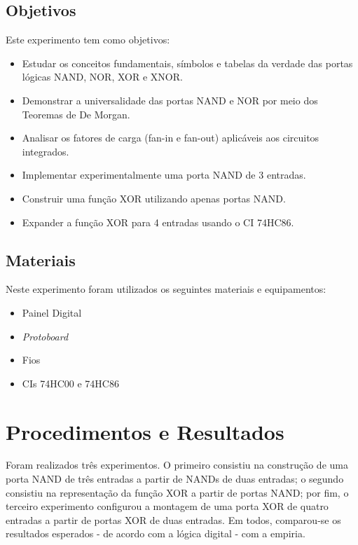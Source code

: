 \documentclass[12pt]{article}
\begin{document}
\subsection{Objetivos}
\label{sec:Objetivos}

Este experimento tem como objetivos:
\begin{itemize}
    \item Estudar os conceitos fundamentais, símbolos e tabelas da verdade das portas lógicas NAND, NOR, XOR e XNOR.
    \item Demonstrar a universalidade das portas NAND e NOR por meio dos Teoremas de De Morgan.
    \item Analisar os fatores de carga (fan-in e fan-out) aplicáveis aos circuitos integrados.
    \item Implementar experimentalmente uma porta NAND de 3 entradas.
    \item Construir uma função XOR utilizando apenas portas NAND.
    \item Expander a função XOR para 4 entradas usando o CI 74HC86.
\end{itemize}

\subsection{Materiais} 
\label{sec:Materiais}
Neste experimento foram utilizados os seguintes materiais e equipamentos:
\begin{itemize}
    \item Painel Digital

    \item \textit{Protoboard}
    
    \item Fios
    
    \item CIs 74HC00 e 74HC86
\end{itemize}

\section{Procedimentos e Resultados}
\label{sec:Procedimentos}

Foram realizados três experimentos. O primeiro consistiu na construção de uma porta NAND de três entradas a partir
de NANDs de duas entradas; o segundo consistiu na representação da função XOR a partir de portas NAND; por fim, o terceiro
experimento configurou a montagem de uma porta XOR de quatro entradas a partir de portas XOR de duas entradas. Em todos, comparou-se
os resultados esperados - de acordo com a lógica digital - com a empiria.
\end{document}
